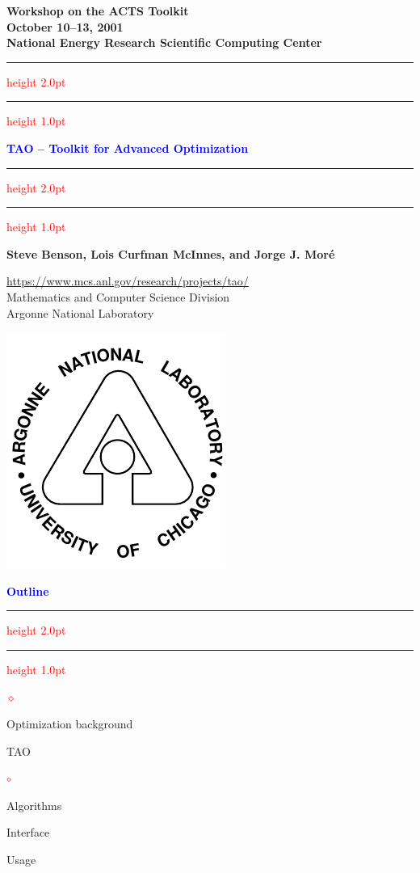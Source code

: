 \documentclass{seminar}
\newcommand{\reddiamond}{\textcolor{red}{$\diamond$}}
\newcommand{\redcircle}{\textcolor{red}{$\circ$}}
\newcommand{\redstripe}{\textcolor{red}{\hrule height 2.0pt\hfil}
             \vspace{-1.8pt}
             \textcolor{red}{\hrule height 1.0pt\hfil}
}
\newcommand{\heading}[1]{%
   \centerline{\textcolor{blue}{\textbf{#1}}}%
    \redstripe%
    \bigskip
}
\begin{document}
\begin{slide}

\begin{center}
{\bf
Workshop on the ACTS Toolkit \\
October 10--13, 2001 \\
National Energy Research Scientific Computing Center
}
\end{center}

\redstripe

\begin{center}
{\bf
\textcolor{blue}{TAO -- Toolkit for Advanced Optimization}
}

\redstripe

\medskip

\centerline{\textbf{Steve Benson, Lois Curfman McInnes, and Jorge J. Mor\'e}}

\end{center}


\parbox[b]{3in}{\url{https://www.mcs.anl.gov/research/projects/tao/} \bigskip \\
\small  Mathematics and Computer Science Division \\ 
Argonne National Laboratory} \includegraphics[scale=0.5]{../images//argonne}

\end{slide}

\begin{slide}

\heading{Outline}

\begin{list}{\reddiamond}{}
\item
Optimization background
\item
TAO
\begin{list}{\redcircle}{}
\item
Algorithms
\item
Interface
\item
Usage
\end{list}
\end{list}

\vfill

\end{slide}
\end{document}
